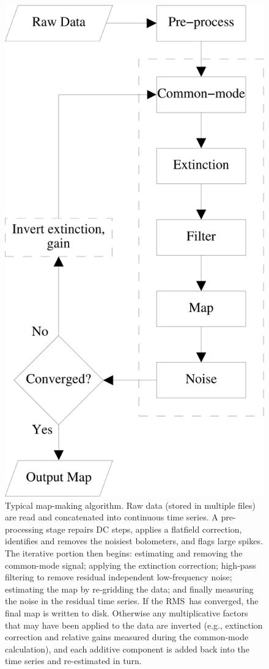 \documentclass[useAMS,usenatbib,nofootinbib]{mn2e}
\newcommand{\rms}{RMS}
\begin{document}
\begin{figure}
\centering
\includegraphics[width=0.75\linewidth]{dimm.pdf}
\caption{Typical map-making algorithm. Raw data (stored in multiple
  files) are read and concatenated into continuous time series. A
  pre-processing stage repairs DC steps, applies a flatfield
  correction, identifies and removes the noisiest bolometers, and
  flags large spikes. The iterative portion then begins: estimating
  and removing the common-mode signal; applying the extinction
  correction; high-pass filtering to remove residual independent
  low-frequency noise; estimating the map by re-gridding the data; and
  finally measuring the noise in the residual time series. If the
  \rms\ has converged, the final map is written to disk. Otherwise any
  multiplicative factors that may have been applied to the data are
  inverted (e.g., extinction correction and relative gains measured
  during the common-mode calculation), and each additive component is
  added back into the time series and re-estimated in turn.}
\label{fig:dimm}
\end{figure}
\end{document}
